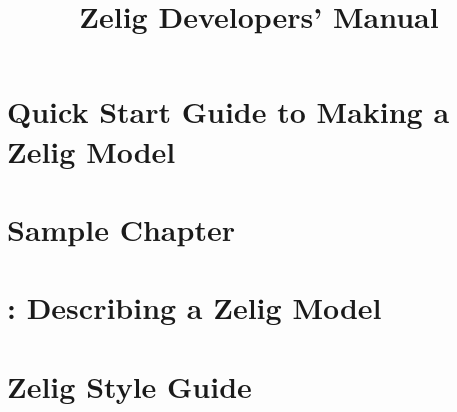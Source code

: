 \documentclass{book}
\title{Zelig Developers' Manual \code{v1.0}}
\begin{document}
\maketitle


\tableofcontents


\chapter[Quick Start Guide]{Quick Start Guide to Making a Zelig Model}
\label{chapter:quickstart}



\chapter[sample]{Sample Chapter}
\label{chapter:sample}



\chapter[\code{describe}]{: Describing a Zelig Model}
\label{chapter:describe}



\chapter[\code{zelig2}]{}
\label{chapter:zelig2}



\chapter[\code{param}]{}
\label{chapter:param}



\chapter[\code{qi}]{}
\label{chapter:qi}



\chapter[Zelig Style Guide]{Zelig Style Guide}
\label{chapter:styleguide}

\end{document}
